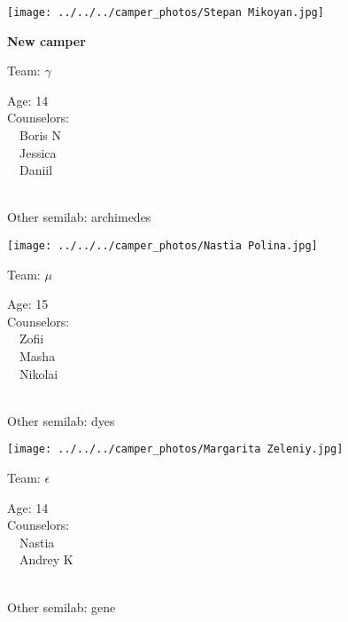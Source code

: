 \documentclass[10pt,letterpaper, landscape]{article}
\begin{document}
\verticalshiftfornextsticker
\renewcommand{\baselinestretch}{1} \begin{sticker}
\noindent\begin{minipage}{0.5\textwidth}\texttt{[image: ../../../camper\_photos/Stepan Mikoyan.jpg]}\end{minipage}\begin{minipage}{0.45\textwidth}
\textbf{New camper} 

Team: {\Large $\gamma$}

Age:        14\\
Counselors: \\\ \ Boris N\\\ \ Jessica\\\ \ Daniil\\
\end{minipage} \\ \vspace{0.07in}
Other semilab: archimedes
\end{sticker}
\horizontalshiftfornextsticker
\renewcommand{\baselinestretch}{1} \begin{sticker}
\noindent\begin{minipage}{0.5\textwidth}\texttt{[image: ../../../camper\_photos/Nastia Polina.jpg]}\end{minipage}\begin{minipage}{0.45\textwidth}
Team: {\Large $\mu$}

Age:        15\\
Counselors: \\\ \ Zofii\\\ \ Masha\\\ \ Nikolai\\
\end{minipage} \\ \vspace{0.07in}
Other semilab: dyes
\end{sticker}
\horizontalshiftfornextsticker
\renewcommand{\baselinestretch}{1} \begin{sticker}
\noindent\begin{minipage}{0.5\textwidth}\texttt{[image: ../../../camper\_photos/Margarita Zeleniy.jpg]}\end{minipage}\begin{minipage}{0.45\textwidth}
Team: {\Large $\epsilon$}

Age:        14\\
Counselors: \\\ \ Nastia\\\ \ Andrey K\\
\end{minipage} \\ \vspace{0.07in}
Other semilab: gene
\end{sticker}
\end{document}
